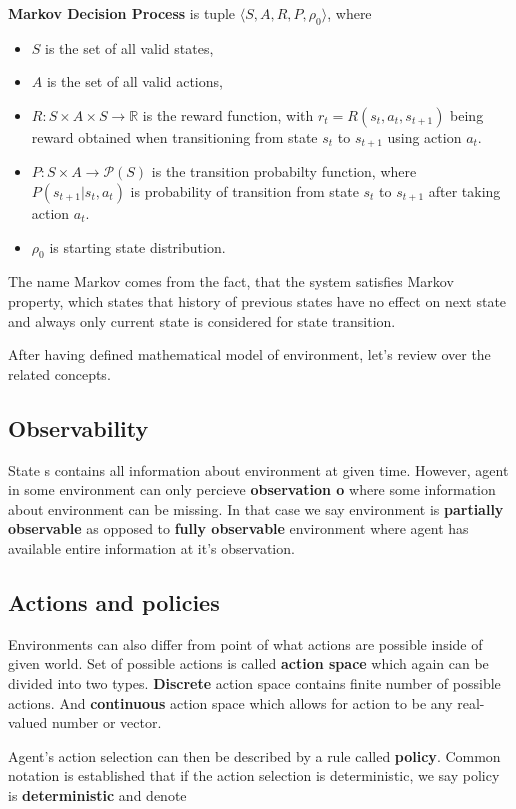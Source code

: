 \label{MDP} \textbf{Markov Decision Process} is tuple $\langle S, A, R, P, \rho_0\rangle$, where
\begin{itemize}
    \item $S$ is the set of all valid states,
    \item $A$ is the set of all valid actions,
    \item $R: S \times A \times S \rightarrow \mathbb{R}$ is the reward function, with $r_t=R(s_t, a_t,s_{t+1})$ being reward obtained when transitioning from state $s_t$ to $s_{t+1}$ using action $a_t$.
    \item $P: S \times A \rightarrow \mathcal{P}(S)$ is the transition probabilty function, where $P(s_{t+1}|s_t, a_t)$ is probability of transition from state $s_t$ to $s_{t+1}$ after taking action $a_t$. 
    \item $\rho_0$ is starting state distribution.
\end{itemize}
The name Markov comes from the fact, that the system satisfies Markov property, which states that history of previous states have no effect on next state and always only current state is considered for state transition.

After having defined mathematical model of environment, let's review over the related concepts.

\subsection*{Observability}
State s contains all information about environment at given time. 
However, agent in some environment can only percieve \textbf{observation o} where some information about environment can be missing.
In that case we say environment is \textbf{partially observable} as opposed to \textbf{fully observable} environment where agent has available entire information at it's observation.

\subsection*{Actions and policies}
Environments can also differ from point of what actions are possible inside of given world.
Set of possible actions is called \textbf{action space} which again can be divided into two types. 
\textbf{Discrete} action space contains finite number of possible actions. 
And \textbf{continuous} action space which allows for action to be any real-valued number or vector.

Agent's action selection can then be described by a rule called \textbf{policy}. 
Common notation is established that if the action selection is deterministic, we say policy is \textbf{deterministic} and denote 

